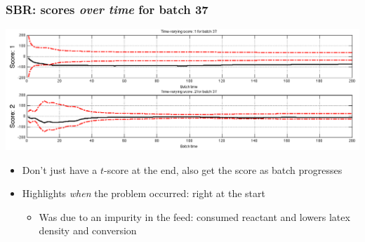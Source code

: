 \begin{frame}\frametitle{SBR: scores \emph{over time} for batch 37}
	
	\begin{center}
		\includegraphics[width=\textwidth]{images/sbr/SBR-time-evolving-scores.png}
	\end{center}
	
	\begin{itemize}
		\item	Don't just have a \( t \)-score at the end, also get the score as batch progresses
		
		\item	Highlights \emph{when} the problem occurred: right at the start
		
				\begin{itemize}
					\item	Was due to an impurity in the feed: consumed reactant and lowers latex density and conversion
				\end{itemize}
	\end{itemize}
	
	{}
\end{frame}

